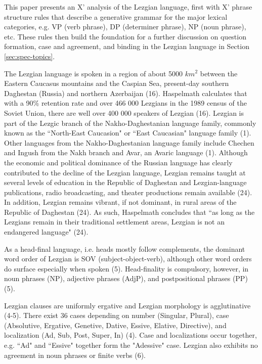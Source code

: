 This paper presents an X' analysis of the Lezgian language, first with X' phrase structure rules that describe a generative grammar for the major lexical categories, e.g. VP (verb phrase), DP (determiner phrase), NP (noun phrase), etc. These rules then build the foundation for a further discussion on question formation, case and agreement, and binding in the Lezgian language in Section \ref{sec:spec-topics}.

The Lezgian language is spoken in a region of about 5000 $km^2$ between the Eastern Caucasus mountains and the Caspian Sea, present-day southern Daghestan (Russia) and northern Azerbaijan (16). Haspelmath calculates that with a 90\% retention rate and over 466 000 Lezgians in the 1989 census of the Soviet Union, there are well over 400 000 speakers of Lezgian (16). Lezgian is part of the Lezgic branch of the Nakho-Daghestanian language family, commonly known as the ``North-East Caucasion" or ``East Caucasian" language family (1). Other languages from the Nakho-Daghestanian language family include Chechen and Ingush from the Nakh branch and Avar, an Avaric language (1). Although the economic and political dominance of the Russian language has clearly contributed to the decline of the Lezgian language, Lezgian remains taught at several levels of education in the Republic of Daghestan and Lezgian-language publications, radio broadcasting, and theater productions remain available (24). In addition, Lezgian remains vibrant, if not dominant, in rural areas of the Republic of Daghestan (24). As such, Haspelmath concludes that ``as long as the Lezgians remain in their traditional settlement areas, Lezgian is not an endangered language" (24).

As a head-final language, i.e. heads mostly follow complements, the dominant word order of Lezgian is SOV (subject-object-verb), although other word orders do surface especially when spoken (5). Head-finality is compulsory, however, in noun phrases (NP), adjective phrases (AdjP), and postpositional phrases (PP) (5).

Lezgian clauses are uniformly ergative and Lezgian morphology is agglutinative (4-5). There exist 36 cases depending on number (Singular, Plural), case (Absolutive, Ergative, Genetive, Dative, Essive, Elative, Directive), and localization (Ad, Sub, Post, Super, In) (4). Case and localizations occur together, e.g. ``Ad" and ``Essive" together form the "Adessive" case. Lezgian also exhibits no agreement in noun phrases or finite verbs (6).